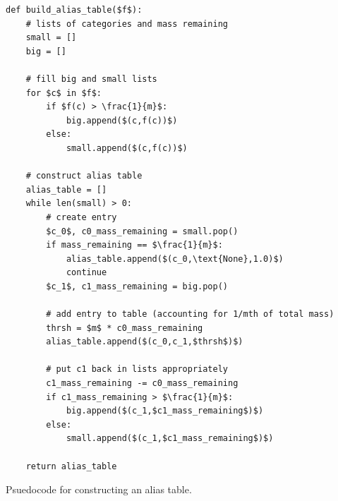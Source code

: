     \begin{Listing}
        \begin{lstlisting}
def build_alias_table($f$):
    # lists of categories and mass remaining
    small = []
    big = []
    
    # fill big and small lists
    for $c$ in $f$:
        if $f(c) > \frac{1}{m}$:
            big.append($(c,f(c))$)
        else:
            small.append($(c,f(c))$)

    # construct alias table
    alias_table = []
    while len(small) > 0:
        # create entry
        $c_0$, c0_mass_remaining = small.pop()
        if mass_remaining == $\frac{1}{m}$:
            alias_table.append($(c_0,\text{None},1.0)$)
            continue
        $c_1$, c1_mass_remaining = big.pop()

        # add entry to table (accounting for 1/mth of total mass)
        thrsh = $m$ * c0_mass_remaining
        alias_table.append($(c_0,c_1,$thrsh$)$)

        # put c1 back in lists appropriately
        c1_mass_remaining -= c0_mass_remaining
        if c1_mass_remaining > $\frac{1}{m}$:
            big.append($(c_1,$c1_mass_remaining$)$)
        else:
            small.append($(c_1,$c1_mass_remaining$)$)
        
    return alias_table
        \end{lstlisting}
        \caption{Psuedocode for constructing an alias table.}
        \label{lst:2:alias_table_construct}
    \end{Listing}





